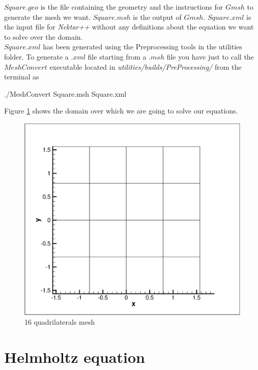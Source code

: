 \documentclass[12pt]{article}
\begin{document}
\noindent
$Square.geo$ is the file containing the geometry and the instructions for $Gmsh$ to generate the mesh we want. $Square.msh$ is the output of $Gmsh$.
$Square.xml$ is the input file for \emph{Nektar++} without any definitions about the equation we want to solve over the domain.\\

\noindent
$Square.xml$ has been generated using the Preprocessing tools in the utilities folder.
To generate a $.xml$ file starting from a $.msh$ file you have just to call the $MeshConvert$ executable located in \emph{utilities/builds/PreProcessing/}
from the terminal as

\vspace{5mm}
\begin{algorithm2e}[H]
./MeshConvert Square.msh Square.xml
\end{algorithm2e}
\vspace{5mm}

Figure \ref{fig:Mesh} shows the domain over which we are going to solve our equations.

\begin{figure}
\centering
\includegraphics[scale=0.35]{mesh.eps}
\caption{16 quadrilaterals mesh}
\label{fig:Mesh}
\end{figure}

\section{Helmholtz equation}
\end{document}
